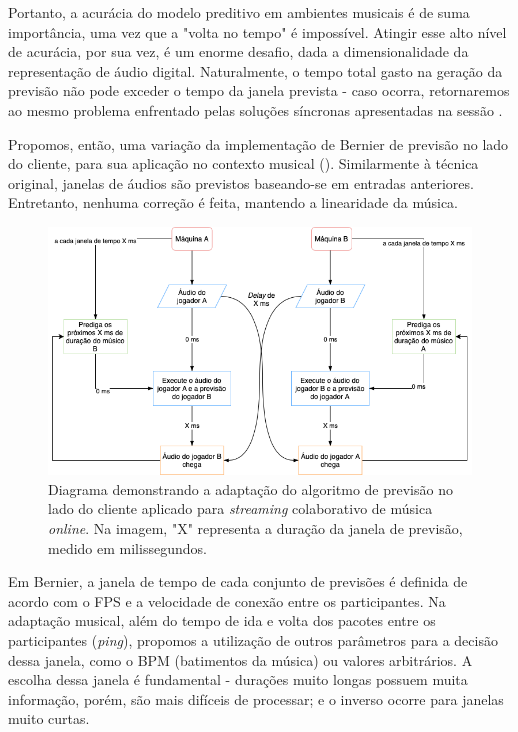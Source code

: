 Portanto, a acurácia do modelo preditivo em ambientes musicais é de suma importância, uma vez que a "volta no tempo" é impossível. Atingir esse alto nível de acurácia, por sua vez, é um enorme desafio, dada a dimensionalidade da representação de áudio digital. Naturalmente, o tempo total gasto na geração da previsão não pode exceder o tempo da janela prevista - caso ocorra, retornaremos ao mesmo problema enfrentado pelas soluções síncronas apresentadas na sessão . 

Propomos, então, uma variação da implementação de Bernier \cite{client-side-prediction} de previsão no lado do cliente, para sua aplicação no contexto musical (). Similarmente à técnica original, janelas de áudios são previstos baseando-se em entradas anteriores. Entretanto, nenhuma correção é feita, mantendo a linearidade da música.

\begin{figure}[htbp]
\centering
\includegraphics[width=1\textwidth]{images/rollback-music.png}
\caption{Diagrama demonstrando a adaptação do algoritmo de previsão no lado do cliente aplicado para \textit{streaming} colaborativo de música \textit{online}. Na imagem, "X" representa a duração da janela de previsão, medido em milissegundos.}
\label{fig:rollback_music_diagram}
\end{figure}

Em Bernier, a janela de tempo de cada conjunto de previsões é definida de acordo com o FPS e a velocidade de conexão entre os participantes. Na adaptação musical, além do tempo de ida e volta dos pacotes entre os participantes (\textit{ping}), propomos a utilização de outros parâmetros para a decisão dessa janela, como o BPM (batimentos da música) ou valores arbitrários. A escolha dessa janela é fundamental - durações muito longas possuem muita informação, porém, são mais difíceis de processar; e o inverso ocorre para janelas muito curtas.

